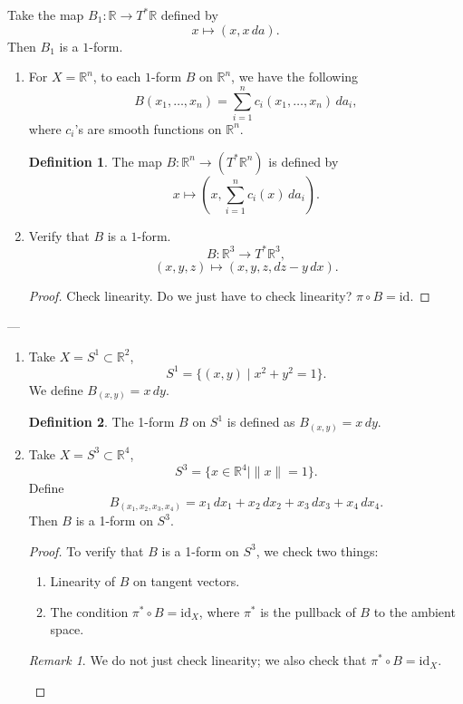 \documentclass[11pt]{article}
\theoremstyle{definition}
\newtheorem{definition}{Definition}[section]
\theoremstyle{remark}
\newtheorem{remark}{Remark}[section]
\begin{document}
Take the map $B_1 \colon \mathbb{R} \to T^*\mathbb{R}$ defined by
\[
x \mapsto (x, x\,da).
\]
Then $B_1$ is a $1$-form.

\begin{enumerate}
    \item For $X = \mathbb{R}^n$, to each $1$-form $B$ on $\mathbb{R}^n$, we have the following
    \[
    B(x_1, \dots, x_n) = \sum_{i=1}^n c_i(x_1, \dots, x_n)\,da_i,
    \]
    where $c_i$'s are smooth functions on $\mathbb{R}^n$.

    \begin{definition}\label{def:1form}
        The map $B \colon \mathbb{R}^n \to (T^*\mathbb{R}^n)$ is defined by
        \[
        x \mapsto \left(x, \sum_{i=1}^n c_i(x)\,da_i\right).
        \]
    \end{definition}

    \item Verify that $B$ is a $1$-form.
    \[
    B \colon \mathbb{R}^3 \to T^*\mathbb{R}^3,
    \]
    \[
    (x, y, z) \mapsto (x, y, z, dz - y\,dx).
    \]

    \begin{proof}
        Check linearity.
        Do we just have to check linearity?
        $\pi \circ B = \mathrm{id}$.
    \end{proof}
\end{enumerate}

---

\begin{enumerate}
    \item Take $X = S^1 \subset \mathbb{R}^2$,
    \[
    S^1 = \{(x, y) \mid x^2 + y^2 = 1\}.
    \]
    We define $B_{(x,y)} = x\,dy$.

    \begin{definition}\label{def:1form_s1}
        The 1-form $B$ on $S^1$ is defined as $B_{(x,y)} = x\,dy$.
    \end{definition}

    \item Take $X = S^3 \subset \mathbb{R}^4$,
    \[
    S^3 = \{x \in \mathbb{R}^4 \mid \|x\| = 1\}.
    \]
    Define
    \[
    B_{(x_1, x_2, x_3, x_4)} = x_1\,dx_1 + x_2\,dx_2 + x_3\,dx_3 + x_4\,dx_4.
    \]
    Then $B$ is a 1-form on $S^3$.

    \begin{proof}
        To verify that $B$ is a 1-form on $S^3$, we check two things:
        \begin{enumerate}
            \item Linearity of $B$ on tangent vectors.
            \item The condition $\pi^* \circ B = \mathrm{id}_X$, where $\pi^*$ is the pullback of $B$ to the ambient space.
        \end{enumerate}
        \begin{remark}\label{rem:check_1form}
            We do not just check linearity; we also check that $\pi^* \circ B = \mathrm{id}_X$.
        \end{remark}
    \end{proof}
\end{enumerate}
\end{document}
